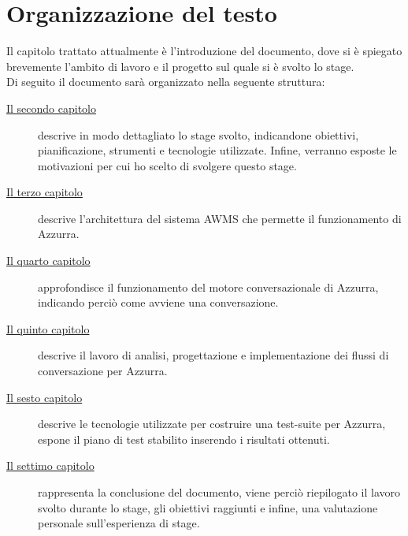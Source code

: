 \section{Organizzazione del testo}
Il capitolo trattato attualmente è l'introduzione del documento, dove si è spiegato brevemente l'ambito di lavoro e il progetto sul quale si è svolto lo stage.\\
Di seguito il documento sarà organizzato nella seguente struttura:
\begin{description}
    
    \item[{\hyperref[cap:descrizione-stage]{Il secondo capitolo}}] descrive in modo dettagliato lo stage svolto, indicandone obiettivi, pianificazione, strumenti e tecnologie utilizzate. Infine, verranno esposte le motivazioni per cui ho scelto di svolgere questo stage.
    
    \item[{\hyperref[cap:archittettura del sistema AWMS]{Il terzo capitolo}}] descrive l'\gls{architettura}\ap{[g]} del sistema \gls{AWMS} che permette il funzionamento di Azzurra.
    
    \item[{\hyperref[cap:flow engine]{Il quarto capitolo}}] approfondisce il funzionamento del motore conversazionale di Azzurra, indicando perciò come avviene una conversazione.
    
    \item[{\hyperref[cap:flussi di conversazione]{Il quinto capitolo}}] descrive il lavoro di analisi, progettazione e implementazione dei flussi di conversazione per Azzurra.
    
    \item[{\hyperref[cap:test]{Il sesto capitolo}}] descrive le tecnologie utilizzate per costruire una test-suite per Azzurra, espone il piano di test stabilito inserendo i risultati ottenuti.
    
    \item[{\hyperref[cap:conclusioni]{Il settimo capitolo}}] rappresenta la conclusione del documento, viene perciò riepilogato il lavoro svolto durante lo stage, gli obiettivi raggiunti e infine, una valutazione personale sull'esperienza di stage.
\end{description}
